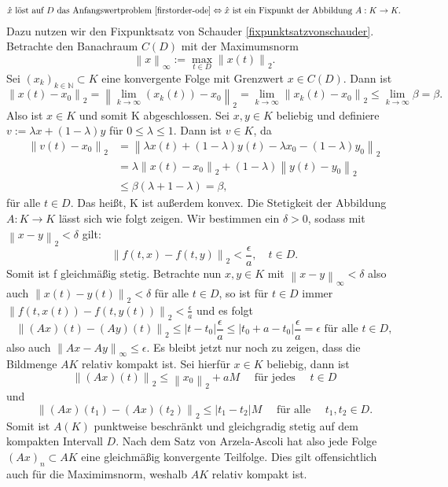 \begin{align}
    \label{peano-äquivalenz-proof}
    \hat{x} \text{ löst auf $D$ das Anfangswertproblem } \eqref{firstorder-ode} \Leftrightarrow \hat{x}
    \text{ ist ein Fixpunkt der Abbildung } A:K \rightarrow K.\linebreak
\end{align}
Dazu nutzen wir den Fixpunktsatz von Schauder \ref{fixpunktsatzvonschauder}. Betrachte den Banachraum $C(D)$ mit der
Maximumsnorm
\[
    \left\lVert x \right\rVert_{\infty}:=\max_{t \in D} \left\lVert x(t) \right\rVert_2.
\]
Sei $(x_k)_{k \in \mathbb{N}} \subset K$ eine konvergente Folge mit Grenzwert $x \in C(D)$. Dann ist
\[
    \left\lVert x(t) - x_0 \right\rVert_2 = \left\lVert \lim_{k \rightarrow \infty}(x_k(t)) - x_0 \right\rVert_2
    = \lim_{k \rightarrow \infty} \left\lVert x_k(t) - x_0 \right\rVert_2 \leq \lim_{k \rightarrow \infty} \beta = \beta.
\]
Also ist $x \in K$ und somit K abgeschlossen. Sei $x,y \in K $ beliebig und definiere $v:=\lambda x + (1-\lambda)y$
für $0 \leq \lambda \leq 1$. Dann ist $v \in K$, da
\begin{align*}
    \left\lVert v(t) - x_0 \right\rVert_2
    &= \left\lVert \lambda x(t) + (1-\lambda)y(t) - \lambda x_0 - (1-\lambda)y_0 \right\rVert_2 \\
    &= \lambda \left\lVert x(t) - x_0 \right\rVert_2 + (1 - \lambda) \left\lVert y(t) - y_0 \right\rVert_2 \\
    &\leq \beta (\lambda + 1 - \lambda) = \beta,
\end{align*}
für alle $t \in D$.
Das heißt, K ist außerdem konvex. Die Stetigkeit der Abbildung $A:K \rightarrow K$ lässt sich wie folgt zeigen.
Wir bestimmen ein $\delta > 0$, sodass mit $\left\lVert x - y \right\rVert_2 < \delta$ gilt:
\[
    \left\lVert f(t,x) - f(t,y) \right\rVert_2 < \frac{\epsilon}{a}, \quad t \in D.
\]
Somit ist f gleichmäßig stetig.
Betrachte nun $x, y \in K$ mit $\left\lVert x - y \right\rVert_{\infty} < \delta$ also auch \linebreak
$\left\lVert x(t) - y(t) \right\rVert_2 < \delta$ für alle $t \in D$, so ist für $t \in D$ immer
$\left\lVert f(t,x(t)) - f(t,y(t)) \right\rVert_2 < \frac{\epsilon}{a}$ und es folgt
\[
    \left\lVert (Ax)(t) - (Ay)(t) \right\rVert_2 \leq |t - t_0| \frac{\epsilon}{a} \leq |t_0 + a - t_0| \frac{\epsilon}{a} = \epsilon
    \text{ für alle } t \in D,
\]
also auch $\left\lVert Ax - Ay \right\rVert_{\infty} \leq \epsilon$. Es bleibt jetzt nur noch zu zeigen, dass die
Bildmenge $AK$ relativ kompakt ist. Sei hierfür $x \in K$ beliebig, dann ist
\[
    \left\lVert (Ax)(t) \right\rVert_2 \leq \left\lVert x_0 \right\rVert_2 + aM \quad \text{ für jedes } \quad t \in D
\] und
\[
    \left\lVert (Ax)(t_1) - (Ax)(t_2) \right\rVert_2 \leq |t_1 - t_2| M \quad \text{ für alle } \quad t_1,t_2 \in D.
\]
Somit ist $A(K)$ punktweise beschränkt und gleichgradig stetig auf dem kompakten Intervall $D$. Nach dem Satz von
Arzela-Ascoli \cite[49]{beckGewohnlicheDifferentialgleichungen2018} hat also jede Folge $(Ax)_n\subset AK$ eine
gleichmäßig konvergente Teilfolge. Dies gilt offensichtlich auch für die Maximimsnorm, weshalb $AK$ relativ kompakt
ist. \qedwhite\\

